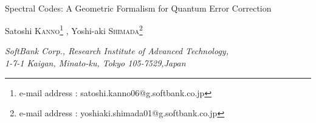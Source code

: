 \documentclass[12pt]{article}
\theoremstyle{definition} %
\theoremstyle{plain} %
\theoremstyle{remark} %
\theoremstyle{underline}
\begin{document}
\setcounter{footnote}{0}
\setcounter{tocdepth}{3}
\bigskip
\def\thefootnote{\arabic{footnote}}




\begin{titlepage}
\renewcommand{\thefootnote}{\fnsymbol{footnote}}
\begin{normalsize}
\begin{flushright}
\end{flushright}
  \end{normalsize}

~~\\

\vspace*{0cm}
    \begin{Large}
       \begin{center}
         {Spectral Codes: A Geometric Formalism for Quantum Error Correction}
       \end{center}
    \end{Large}
\vspace{0.7cm}


\begin{center}
Satoshi K\textsc{anno}\footnote[1]
            {
e-mail address : satoshi.kanno06@g.softbank.co.jp}
,
Yoshi-aki S\textsc{himada}\footnote[2]
            {
e-mail address : yoshiaki.shimada01@g.softbank.co.jp}

\vspace{0.7cm}

    {\it SoftBank Corp., Research Institute of Advanced Technology,}\\
               {\it 1-7-1 Kaigan, Minato-ku, Tokyo 105-7529,Japan}
               \end{center}

\vspace{0.5cm}

\begin{abstract}
\noindent
We present a new geometric perspective on quantum error correction based on spectral triples in noncommutative geometry. In this approach, quantum error-correcting codes are reformulated as low-energy spectral projections of Dirac-type operators that separate global logical degrees of freedom from local, correctable errors. Locality, code distance, and the Knill–Laflamme condition acquire a unified spectral and geometric interpretation in terms of the induced metric and spectrum of the Dirac operator.


\end{abstract}
\end{titlepage}
\end{document}
